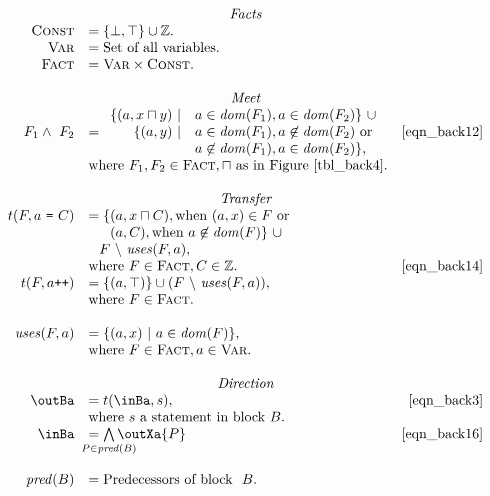 \begin{math}
  \begin{array}{rlr}

    \multicolumn{3}{c}{\emph{Facts}} \\

    \setLC &= \{\bot, \top\} \cup \ZZ.\\
    \setL{Var} &= \text{Set of all variables.} \\
    \setL{Fact} &= \setL{Var} \times \setLC. \\\\

    \multicolumn{3}{c}{\emph{Meet}} \\

    F_1 \wedge\ F_2 &= \begin{array}{rl}
      \{(a, x \lub y)\ | & a \in \dom(F_1), a \in \dom(F_2)\}\ \cup \\
      \{(a, y)\ | & a \in \dom(F_1), a \not\in \dom(F_2)\ \text{or} \\
      & a \not\in \dom(F_1), a \in \dom(F_2)\},
    \end{array} \labeleq{eqn_back13} \labeleq{eqn_back12} & \eqref{eqn_back12} \\
    & \text{where\ } F_1, F_2 \in \setL{Fact}, \lub\ \text{as in Figure~\ref{tbl_back4}.} \\\\

    \multicolumn{3}{c}{\emph{Transfer}} \\
    t (F, a\ \text{\tt =}\ C) &= \{(a, x \lub C), \text{when\ } (a, x) \in F\ \text{or} \\
    & \phantom{= \{}(a, C), \text{when\ } a \not\in \dom(F)\}\ \cup \\
    & \phantom{=} F\ \backslash\ \mfun{uses}(F, a),\\
    & \text{where\ } F \in \setL{Fact}, C \in \ZZ. \labeleq{eqn_back14} & \eqref{eqn_back14} \\
    t (F, a\text{\tt ++}) &= \{(a, \top)\} \cup (F\ \backslash\ \mfun{uses}(F, a)), \\
    & \text{where\ } F \in \setL{Fact}. \\\\
    \mfun{uses}(F, a) &= \{(a, x)\ |\ a \in \dom(F)\}, \\
    & \text{where\ } F \in \setL{Fact}, a \in \setL{Var}. \\\\

    \multicolumn{3}{c}{\emph{Direction}} \\

    \outBa &= t(\inBa, s), \labeleq{eqn_back3} & \eqref{eqn_back3} \\
    & \text{where $s$ a statement in block\ } B.\\
    \inBa &= \bigwedge\limits_{\mathclap{P \in \mathit{pred}(B)}} \outXa{P} \labeleq{eqn_back16} & \eqref{eqn_back16} \\\\ 
    \mfun{pred}(B) &= \text{Predecessors of block }\ B.
  \end{array}
\end{math}
